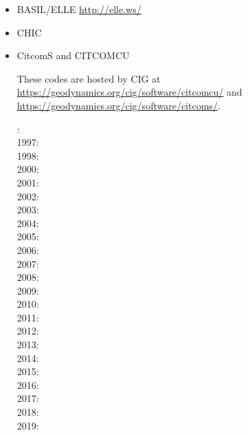 \begin{itemize}
\item BASIL/ELLE \url{http://elle.ws/}
\cite{bokj08}
\cite{llor19}

\item CHIC 
\cite{norv15}

\item CitcomS and CITCOMCU

These codes are hosted by CIG at \url{https://geodynamics.org/cig/software/citcomcu/}
and \url{https://geodynamics.org/cig/software/citcoms/}.

: \cite{somo96}\\
1997: \cite{mole97}\\
1998: \cite{moso98}\cite{zhgm98}\cite{vazh99}\\
2000: \cite{zhzm00}\cite{gumr00}\\
2001: \cite{bigu01}\\
2002: \cite{tagh02}\\
2003: \cite{vazh03}\cite{cogu03}\cite{bigu03}\\
2004: \cite{solo04}\\
2005: \cite{bihi05}\cite{mczh05a}\cite{mczh05b}\\
2006: \cite{beck06}\cite{pibf06}\cite{tact06}\cite{besb06}\cite{coli06}\\
2007: \cite{bihi07}\cite{zhzl07}\cite{magu07}\cite{bavi07}\cite{rimb07}\cite{mofm07}\cite{cobs07}\\
2008: \cite{dihf08}\cite{gamc08}\cite{zhmt08}\cite{hole08}\\
2009: \cite{lizh09}\cite{arhm09}\cite{zhzm09}\cite{anbi09}\cite{fobe09}\cite{bubi09}\cite{befa09}
      \cite{bavi09}\cite{lezh09}\\
2010: \cite{bumb10}\cite{vabv10}\cite{baiv10}\cite{bubi10}\cite{zhzl10}\cite{bill10}\cite{jabi10}\\
2011: \cite{befa11}\cite{lemj11}\cite{vaal11}\cite{legu11}\cite{list11}\cite{baiv11}\\
2012: \cite{arbi12}\cite{jabi12}\cite{bija12}\cite{bova12}\cite{hucf12}\cite{zhym12}\cite{solo12}
\cite{hibi12}\cite{jabk12}\cite{mapm12}\\
2013: \cite{bacs13}\cite{bogs13a}\cite{bogs13b}\cite{jabr13}\cite{qula13}\cite{oldh13}\cite{arbi13}\cite{cost13}\\
2014: \cite{flgw14}\cite{budt14}\cite{kava14}\cite{arfw14}\cite{wavp14}\cite{seki14}\cite{agvg14}
\cite{mabv14}\cite{zhu14}\\
2015: \cite{bacs15}\cite{bogf15}\cite{bomv15}\cite{sefw15}\cite{daso15}\cite{vami15}\cite{wazh15}
\cite{wavp15}\cite{waav15}\cite{hafg15}\cite{tarn15}\cite{legu15}\\
2016: \cite{welm16}\cite{wele16}\cite{jada16}\cite{frbs16}\cite{robn16}\\
2017: \cite{aggv17}\cite{maav17}\cite{frbm17}\cite{haja17}\\
2018: \cite{hect18}\cite{king18}\cite{kavb18}\cite{wavp18}\\
2019: \cite{mavb19}\cite{fube19}\cite{magn19}\cite{malg19}\cite{mazh19}



\end{itemize}
